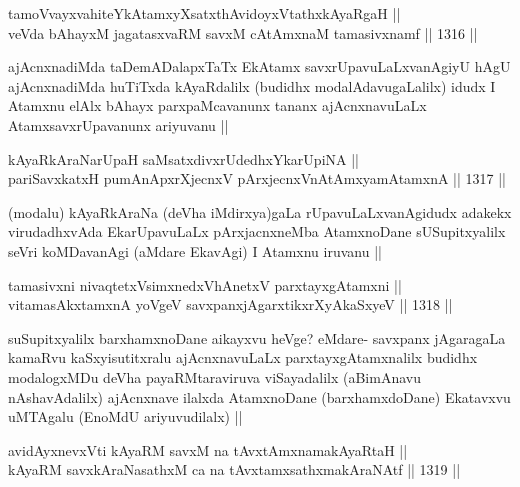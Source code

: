 \begin{shl}
tamoVvayxvahiteYkAtamxyXsatxthA\s vidoyxVtathxkAyaRgaH || \\
veVda bAhayxM jagatasxvaRM savxM cA\s \s tAmxnaM tamasivxnamf ||  1316 ||  
\end{shl}

\begin{artha}
ajAcnxnadiMda taDemADalapxTaTx EkAtamx savxrUpavuLaLxvanAgiyU hAgU ajAcnxnadiMda huTiTxda kAyaRdalilx (budidhx modalAdavugaLalilx) idudx I Atamxnu elAlx bAhayx parxpaMcavanunx tananx ajAcnxnavuLaLx AtamxsavxrUpavanunx ariyuvanu ||
\end{artha}

\begin{shl}
kAyaRkAraNarUpaH saMsatxdivxrUdedhxYkarUpiNA || \\
pariSavxkatxH pumAnApxrXjecnxV pArxjecnxVnA\s \s tAmx\s yamAtamxnA ||  1317 ||  
\end{shl}

\begin{artha}
(modalu) kAyaRkAraNa (deVha iMdirxya)gaLa rUpavuLaLxvanAgidudx adakekx virudadhxvAda EkarUpavuLaLx pArxjacnxneMba AtamxnoDane sUSupitxyalilx seVri koMDavanAgi (aMdare EkavAgi) I Atamxnu iruvanu ||
\end{artha}

\begin{shl}
tamasivxni nivaqtetxV\s simxnedxVhAnetxV parxtayxgAtamxni || \\
vitamasAkxtamxnA yoVgeV savxpanxjAgarxtikxrXyAkaSxyeV ||  1318 ||  
\end{shl}

\begin{artha}
suSupitxyalilx barxhamxnoDane aikayxvu heVge? eMdare- savxpanx jAgaragaLa kamaRvu kaSxyisutitxralu ajAcnxnavuLaLx parxtayxgAtamxnalilx budidhx modalogxMDu deVha payaRMtaraviruva viSayadalilx (aBimAnavu nAshavAdalilx) ajAcnxnave ilalxda AtamxnoDane (barxhamxdoDane) Ekatavxvu uMTAgalu (EnoMdU ariyuvudilalx) ||
\end{artha}


\begin{shl}
avidAyx\s nevxVti kAyaRM savxM na tAvxtAmxnamakAyaRtaH || \\
kAyaRM savxkAraNasathxM ca na tAvxtamxsathxmakAraNAtf ||  1319 || 
\end{shl}

